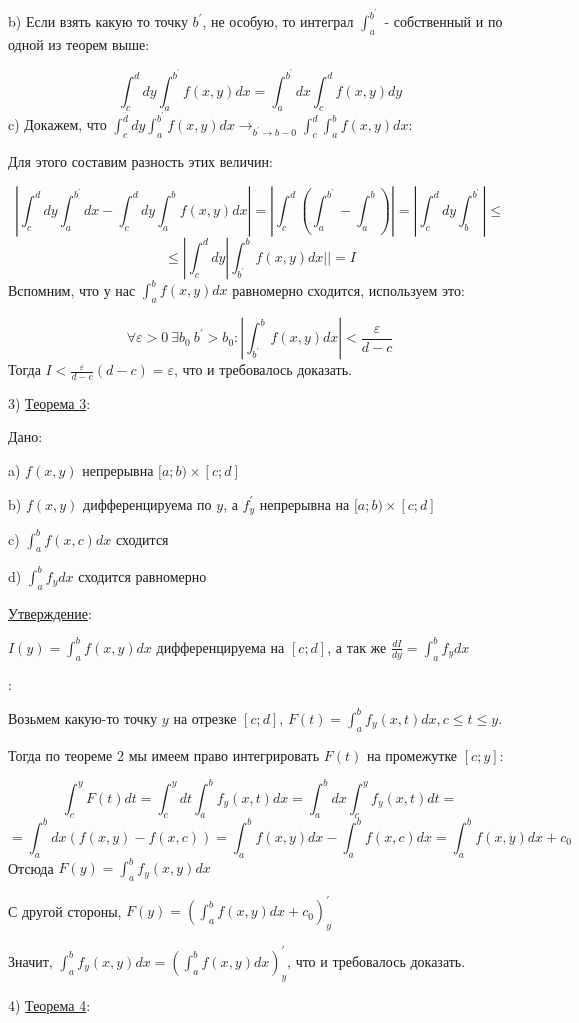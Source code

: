 \documentclass[12pt]{article}
\begin{document}
b) Если взять какую то точку $b^{'}$, не особую, то интеграл $\int_a^{b^{'}}$ - собственный и по одной из теорем выше:\par
$$\int_c^d dy \int_a^{b^{'}} f(x,y) dx = \int_{a}^{b^{'}} dx \int_c^d f(x,y) dy$$
c) Докажем, что $\int_c^d dy \int_a^{b^{'}} f(x,y) dx \to_{b^{'}\to b-0} \int_c^d \int_a^b f(x,y) dx$:\par
Для этого составим разность этих величин:\par
$$|\int_c^d dy \int_a^{b^{'}} dx - \int_c^d dy \int_a^b f(x,y) dx| = |\int_c^d (\int_a^{b^{'}} - \int_a^b)| = |\int_c^d dy \int_b^{b^{'}} | \leq$$
$$ \leq |\int_c^d dy |\int_{b^{'}}^b f(x,y) dx|| = I$$
Вспомним, что у нас $\int_a^b f(x,y) dx$ равномерно сходится, используем это:\par
$$\forall \varepsilon > 0 \ \exists b_0 \ b^{'} > b_0 : | \int_{b^{'}}^b f(x,y) dx| < \frac{\varepsilon}{d-c}$$
Тогда $I < \frac{\varepsilon}{d-c} (d-c) = \varepsilon$, что и требовалось доказать.\par
3) \uline{Теорема 3}:\par
Дано:\par
a) $f(x,y)$ непрерывна $[a; b) \times [c;d]$\par
b) $f(x,y)$ дифференцируема по $y$, а $f^{'}_y$ непрерывна на $[a; b) \times [c;d]$\par
c) $\int_a^b f(x,c) dx$ сходится\par
d) $\int_a^b f_y dx$ сходится равномерно\par
\uline{Утверждение}:\par
$I(y) = \int_a^b f(x,y) dx$ дифференцируема на $[c;d]$, а так же $\frac{d I}{dy} = \int_a^b f_y dx$\par
{}:\par
Возьмем какую-то точку $y$ на отрезке $[c;d]$, $F(t) = \int_a^b f_y(x,t) dx, c \leq t \leq y$.\par
Тогда по теореме 2 мы имеем право интегрировать $F(t)$ на промежутке $[c;y]$:\par
$$\int_c^y F(t) dt = \int_c^y dt \int_a^b f_y(x,t) dx = \int_a^b dx \int_c^y f_y(x,t) dt =$$
$$= \int_a^b dx(f(x,y) - f(x,c)) = \int_a^b f(x,y) dx - \int_a^b f(x,c) dx = \int_a^b f(x,y) dx + c_0$$
Отсюда $F(y) = \int_a^b f_y (x,y) dx$\par
С другой стороны, $F(y) = (\int_a^b f(x,y) dx + c_0)_y^{'}$\par
Значит, $\int_a^b f_y(x,y) dx = (\int_a^b f(x,y)dx)^{'}_y$, что и требовалось доказать.\par
4) \uline{Теорема 4}:\par
\end{document}
